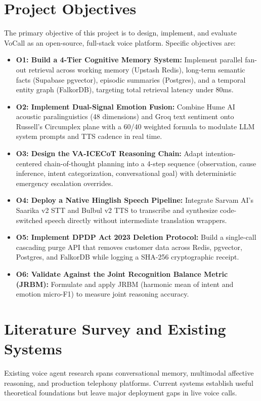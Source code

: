 \documentclass[12pt,a4paper]{article}
\begin{document}
\section{Project Objectives}
The primary objective of this project is to design, implement, and evaluate VoCall as an open-source, full-stack voice platform. Specific objectives are:

\begin{itemize}[leftmargin=*]
    \item \textbf{O1: Build a 4-Tier Cognitive Memory System:} Implement parallel fan-out retrieval across working memory (Upstash Redis), long-term semantic facts (Supabase pgvector), episodic summaries (Postgres), and a temporal entity graph (FalkorDB), targeting total retrieval latency under 80ms.
    \item \textbf{O2: Implement Dual-Signal Emotion Fusion:} Combine Hume AI acoustic paralinguistics (48 dimensions) and Groq text sentiment onto Russell's Circumplex plane with a 60/40 weighted formula to modulate LLM system prompts and TTS cadence in real time.
    \item \textbf{O3: Design the VA-ICECoT Reasoning Chain:} Adapt intention-centered chain-of-thought planning into a 4-step sequence (observation, cause inference, intent categorization, conversational goal) with deterministic emergency escalation overrides.
    \item \textbf{O4: Deploy a Native Hinglish Speech Pipeline:} Integrate Sarvam AI's Saarika v2 STT and Bulbul v2 TTS to transcribe and synthesize code-switched speech directly without intermediate translation wrappers.
    \item \textbf{O5: Implement DPDP Act 2023 Deletion Protocol:} Build a single-call cascading purge API that removes customer data across Redis, pgvector, Postgres, and FalkorDB while logging a SHA-256 cryptographic receipt.
    \item \textbf{O6: Validate Against the Joint Recognition Balance Metric (JRBM):} Formulate and apply JRBM (harmonic mean of intent and emotion micro-F1) to measure joint reasoning accuracy.
\end{itemize}

\section{Literature Survey and Existing Systems}

Existing voice agent research spans conversational memory, multimodal affective reasoning, and production telephony platforms. Current systems establish useful theoretical foundations but leave major deployment gaps in live voice calls.
\end{document}
